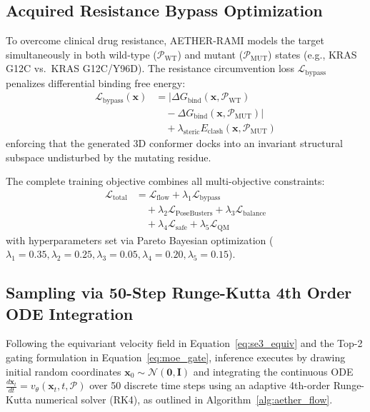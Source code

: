 \documentclass[10pt,journal,compsoc]{IEEEtran}
\begin{document}
\subsection{Acquired Resistance Bypass Optimization}
To overcome clinical drug resistance, AETHER-RAMI models the target simultaneously in both wild-type ($\mathcal{P}_{\text{WT}}$) and mutant ($\mathcal{P}_{\text{MUT}}$) states (e.g., KRAS G12C vs.\ KRAS G12C/Y96D). The resistance circumvention loss $\mathcal{L}_{\text{bypass}}$ penalizes differential binding free energy:
\begin{equation}
\begin{split}
\mathcal{L}_{\text{bypass}}(\mathbf{x}) &= \big| \Delta G_{\text{bind}}(\mathbf{x}, \mathcal{P}_{\text{WT}}) \\
&\quad - \Delta G_{\text{bind}}(\mathbf{x}, \mathcal{P}_{\text{MUT}}) \big| \\
&\quad + \lambda_{\text{steric}} E_{\text{clash}}(\mathbf{x}, \mathcal{P}_{\text{MUT}})
\end{split}
\label{eq:bypass_loss}
\end{equation}
enforcing that the generated 3D conformer docks into an invariant structural subspace undisturbed by the mutating residue.

The complete training objective combines all multi-objective constraints:
\begin{equation}
\begin{split}
\mathcal{L}_{\text{total}} &= \mathcal{L}_{\text{flow}} + \lambda_1 \mathcal{L}_{\text{bypass}} \\
&\quad + \lambda_2 \mathcal{L}_{\text{PoseBusters}} + \lambda_3 \mathcal{L}_{\text{balance}} \\
&\quad + \lambda_4 \mathcal{L}_{\text{safe}} + \lambda_5 \mathcal{L}_{\text{QM}}
\end{split}
\label{eq:total_loss}
\end{equation}
with hyperparameters set via Pareto Bayesian optimization ($\lambda_1 = 0.35, \lambda_2 = 0.25, \lambda_3 = 0.05, \lambda_4 = 0.20, \lambda_5 = 0.15$).

\subsection{Sampling via 50-Step Runge-Kutta 4th Order ODE Integration}
Following the equivariant velocity field in Equation~\eqref{eq:se3_equiv} and the Top-2 gating formulation in Equation~\eqref{eq:moe_gate}, inference executes by drawing initial random coordinates $\mathbf{x}_0 \sim \mathcal{N}(\mathbf{0}, \mathbf{I})$ and integrating the continuous ODE $\frac{d\mathbf{x}_t}{dt} = v_\theta(\mathbf{x}_t, t, \mathcal{P})$ over 50 discrete time steps using an adaptive 4th-order Runge-Kutta numerical solver (RK4), as outlined in Algorithm~\ref{alg:aether_flow}.
\end{document}
